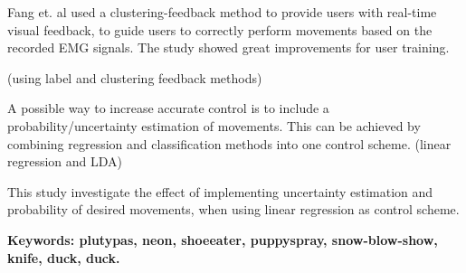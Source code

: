 Fang et. al \cite{Fang2017} used a clustering-feedback method to provide users with real-time visual feedback, to guide users to correctly perform movements based on the recorded EMG signals. The study showed great improvements for user training. 

(using label and clustering feedback methods) 




A possible way to increase accurate control is to include a probability/uncertainty estimation of movements. This can be achieved by combining regression and classification methods into one control scheme. (linear regression and LDA)

This study investigate the effect of implementing uncertainty estimation and probability of desired movements, when using linear regression as control scheme. 


\textbf{Keywords: plutypas, neon, shoeeater, puppyspray, snow-blow-show, knife, duck, duck.}